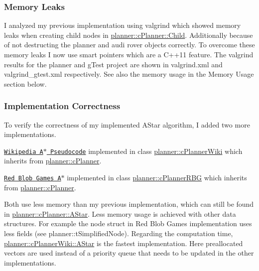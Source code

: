 \subsubsection*{Memory Leaks}

I analyzed my previous implementation using valgrind which showed memory leaks when creating child nodes in \mbox{\hyperlink{classplanner_1_1c_planner_adbffc6ce05119c940a09369d7e61554e}{planner\+::c\+Planner\+::\+Child}}. Additionally because of not destructing the planner and audi rover objects correctly. To overcome these memory leaks I now use smart pointers which are a C++11 feature. The valgrind results for the planner and g\+Test project are shown in valgrind.\+xml and valgrind\+\_\+gtest.\+xml respectively. See also the memory usage in the Memory Usage section below.

\subsubsection*{Implementation Correctness}

To verify the correctness of my implemented A\+Star algorithm, I added two more implementations.
\begin{DoxyEnumerate}
\item \href{https://en.wikipedia.org/wiki/A*_search_algorithm#Pseudocode}{\tt Wikipedia A$\ast$ Pseudocode} implemented in class \mbox{\hyperlink{classplanner_1_1c_planner_wiki}{planner\+::c\+Planner\+Wiki}} which inherits from \mbox{\hyperlink{classplanner_1_1c_planner}{planner\+::c\+Planner}}.
\item \href{https://www.redblobgames.com/pathfinding/a-star/implementation.html#cplusplus}{\tt Red Blob Games A$\ast$} implemented in class \mbox{\hyperlink{classplanner_1_1c_planner_r_b_g}{planner\+::c\+Planner\+R\+BG}} which inherits from \mbox{\hyperlink{classplanner_1_1c_planner}{planner\+::c\+Planner}}.
\end{DoxyEnumerate}

Both use less memory than my previous implementation, which can still be found in \mbox{\hyperlink{classplanner_1_1c_planner_a341e70531266f023ac9461d18979d1ef}{planner\+::c\+Planner\+::\+A\+Star}}. Less memory usage is achieved with other data structures. For example the node struct in Red Blob Games implementation uses less fields (see planner\+::t\+Simplified\+Node). Regarding the computation time, \mbox{\hyperlink{classplanner_1_1c_planner_wiki_aa673ebc2b1b43af3b13fb0c958c5f2e4}{planner\+::c\+Planner\+Wiki\+::\+A\+Star}} is the fastest implementation. Here preallocated vectors are used instead of a priority queue that needs to be updated in the other implementations.

